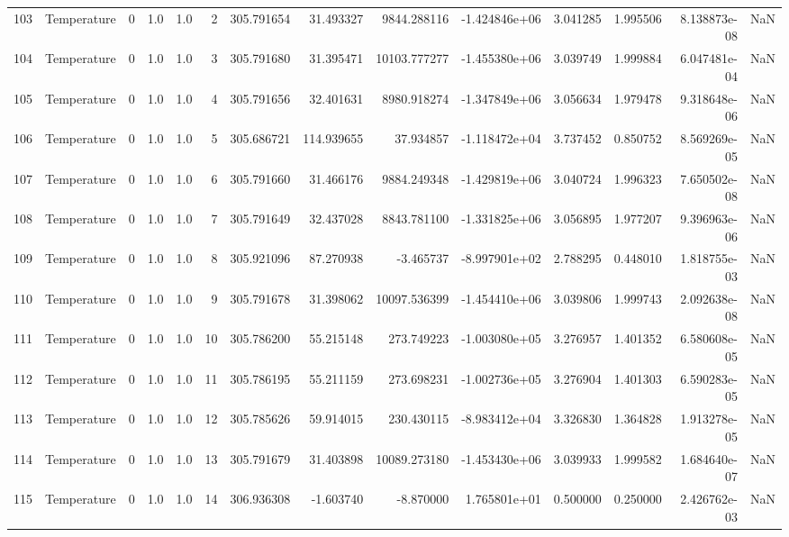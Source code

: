 \begin{tabular}{llrrrrrrrrrrrr}
103 &  Temperature &       0 &  1.0 &  1.0 &    2 &  305.791654 &    31.493327 &    9844.288116 & -1.424846e+06 &  3.041285 &  1.995506 &  8.138873e-08 &      NaN \\
104 &  Temperature &       0 &  1.0 &  1.0 &    3 &  305.791680 &    31.395471 &   10103.777277 & -1.455380e+06 &  3.039749 &  1.999884 &  6.047481e-04 &      NaN \\
105 &  Temperature &       0 &  1.0 &  1.0 &    4 &  305.791656 &    32.401631 &    8980.918274 & -1.347849e+06 &  3.056634 &  1.979478 &  9.318648e-06 &      NaN \\
106 &  Temperature &       0 &  1.0 &  1.0 &    5 &  305.686721 &   114.939655 &      37.934857 & -1.118472e+04 &  3.737452 &  0.850752 &  8.569269e-05 &      NaN \\
107 &  Temperature &       0 &  1.0 &  1.0 &    6 &  305.791660 &    31.466176 &    9884.249348 & -1.429819e+06 &  3.040724 &  1.996323 &  7.650502e-08 &      NaN \\
108 &  Temperature &       0 &  1.0 &  1.0 &    7 &  305.791649 &    32.437028 &    8843.781100 & -1.331825e+06 &  3.056895 &  1.977207 &  9.396963e-06 &      NaN \\
109 &  Temperature &       0 &  1.0 &  1.0 &    8 &  305.921096 &    87.270938 &      -3.465737 & -8.997901e+02 &  2.788295 &  0.448010 &  1.818755e-03 &      NaN \\
110 &  Temperature &       0 &  1.0 &  1.0 &    9 &  305.791678 &    31.398062 &   10097.536399 & -1.454410e+06 &  3.039806 &  1.999743 &  2.092638e-08 &      NaN \\
111 &  Temperature &       0 &  1.0 &  1.0 &   10 &  305.786200 &    55.215148 &     273.749223 & -1.003080e+05 &  3.276957 &  1.401352 &  6.580608e-05 &      NaN \\
112 &  Temperature &       0 &  1.0 &  1.0 &   11 &  305.786195 &    55.211159 &     273.698231 & -1.002736e+05 &  3.276904 &  1.401303 &  6.590283e-05 &      NaN \\
113 &  Temperature &       0 &  1.0 &  1.0 &   12 &  305.785626 &    59.914015 &     230.430115 & -8.983412e+04 &  3.326830 &  1.364828 &  1.913278e-05 &      NaN \\
114 &  Temperature &       0 &  1.0 &  1.0 &   13 &  305.791679 &    31.403898 &   10089.273180 & -1.453430e+06 &  3.039933 &  1.999582 &  1.684640e-07 &      NaN \\
115 &  Temperature &       0 &  1.0 &  1.0 &   14 &  306.936308 &    -1.603740 &      -8.870000 &  1.765801e+01 &  0.500000 &  0.250000 &  2.426762e-03 &      NaN \\

\end{tabular}
